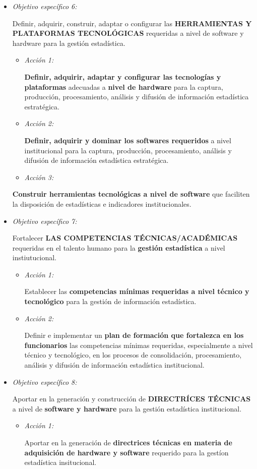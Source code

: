 \documentclass[
]{book}
\begin{document}
\begin{itemize}
\item
  \emph{Objetivo específico 6:}

  Definir, adquirir, construir, adaptar o configurar las \textbf{HERRAMIENTAS Y PLATAFORMAS TECNOLÓGICAS} requeridas a nivel de software y hardware para la gestión estadística.

  \begin{itemize}
  \item
    \emph{Acción 1:}

    \textbf{Definir, adquirir, adaptar y configurar las tecnologías y plataformas} adecuadas a \textbf{nivel de hardware} para la captura, producción, procesamiento, análisis y difusión de información estadística estratégica.
  \item
    \emph{Acción 2:}

    \textbf{Definir, adquirir y dominar los softwares requeridos} a nivel institucional para la captura, producción, procesamiento, análisis y difusión de información estadística estratégica.
  \item
    \emph{Acción 3:}
  \end{itemize}

  \textbf{Construir herramientas tecnológicas a nivel de software} que faciliten la disposición de estadísticas e indicadores institucionales.
\item
  \emph{Objetivo específico 7:}

  Fortalecer \textbf{LAS COMPETENCIAS TÉCNICAS/ACADÉMICAS} requeridas en el talento humano para la \textbf{gestión estadística} a nivel instiutucional.

  \begin{itemize}
  \item
    \emph{Acción 1:}

    Establecer las \textbf{competencias mínimas requeridas a nivel técnico y tecnológico} para la gestión de información estadística.
  \item
    \emph{Acción 2:}

    Definir e implementar un \textbf{plan de formación que fortalezca en los funcionarios} las competencias mínimas requeridas, especialmente a nivel técnico y tecnológico, en los procesos de consolidación, procesamiento, análisis y difusión de información estadística institucional.
  \end{itemize}
\item
  \emph{Objetivo específico 8:}

  Aportar en la generación y construcción de \textbf{DIRECTRÍCES TÉCNICAS} a nivel de \textbf{software y hardware} para la gestión estadística institucional.

  \begin{itemize}
  \item
    \emph{Acción 1:}

    Aportar en la generación de \textbf{directrices técnicas en materia de adquisición de hardware y software} requerido para la gestíon estadística insitucional.
  \end{itemize}
\end{itemize}
\end{document}
